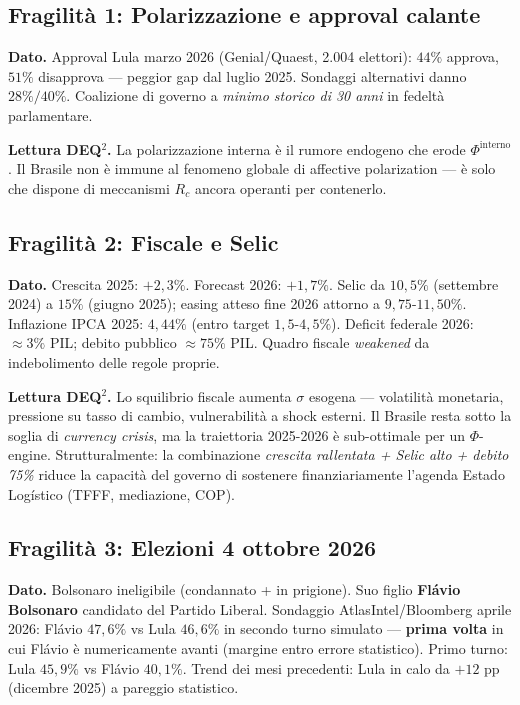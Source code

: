 \subsection{Fragilità 1: Polarizzazione e approval
calante}\label{fragilituxe0-1-polarizzazione-e-approval-calante}

\Proved{} \textbf{Dato.} Approval Lula marzo 2026 (Genial/Quaest, 2.004
elettori): \(44\%\) approva, \(51\%\) disapprova --- peggior gap dal
luglio 2025. Sondaggi alternativi danno \(28\%/40\%\). Coalizione di
governo a \emph{minimo storico di 30 anni} in fedeltà parlamentare.

\Conj{} \textbf{Lettura DEQ$^2$.} La polarizzazione interna è il rumore
endogeno che erode \(\Phi^{\text{interno}}\). Il Brasile non è immune al
fenomeno globale di affective polarization --- è solo che dispone di
meccanismi \(R_c\) ancora operanti per contenerlo.

\subsection{Fragilità 2: Fiscale e
Selic}\label{fragilituxe0-2-fiscale-e-selic}

\Proved{} \textbf{Dato.} Crescita 2025: \(+2{,}3\%\). Forecast 2026:
\(+1{,}7\%\). Selic da \(10{,}5\%\) (settembre 2024) a \(15\%\) (giugno
2025); easing atteso fine 2026 attorno a \(9{,}75\)-\(11{,}50\%\).
Inflazione IPCA 2025: \(4{,}44\%\) (entro target \(1{,}5\)-\(4{,}5\%\)).
Deficit federale 2026: \(\approx 3\%\) PIL; debito pubblico
\(\approx 75\%\) PIL. Quadro fiscale \emph{weakened} da indebolimento
delle regole proprie.

\Conj{} \textbf{Lettura DEQ$^2$.} Lo squilibrio fiscale aumenta \(\sigma\)
esogena --- volatilità monetaria, pressione su tasso di cambio,
vulnerabilità a shock esterni. Il Brasile resta sotto la soglia di
\emph{currency crisis}, ma la traiettoria 2025-2026 è sub-ottimale per
un \(\Phi\)-engine. Strutturalmente: la combinazione \emph{crescita
rallentata + Selic alto + debito 75\%} riduce la capacità del governo di
sostenere finanziariamente l'agenda Estado Logístico (TFFF, mediazione,
COP).

\subsection{Fragilità 3: Elezioni 4 ottobre
2026}\label{fragilituxe0-3-elezioni-4-ottobre-2026}

\Proved{} \textbf{Dato.} Bolsonaro ineligibile (condannato + in
prigione). Suo figlio \textbf{Flávio Bolsonaro} candidato del Partido
Liberal. Sondaggio AtlasIntel/Bloomberg aprile 2026: Flávio \(47{,}6\%\)
vs Lula \(46{,}6\%\) in secondo turno simulato --- \textbf{prima volta}
in cui Flávio è numericamente avanti (margine entro errore statistico).
Primo turno: Lula \(45{,}9\%\) vs Flávio \(40{,}1\%\). Trend dei mesi
precedenti: Lula in calo da \(+12\) pp (dicembre 2025) a pareggio
statistico.

